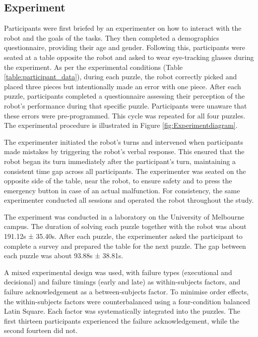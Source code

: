 \subsection{Experiment}



 Participants were first briefed by an experimenter on how to interact with the robot and the goals of the tasks. They then completed a demographics questionnaire, providing their age and gender. Following this, participants were seated at a table opposite the robot and asked to wear eye-tracking glasses during the experiment. As per the experimental conditions (Table \ref{table:participant_data}), during each puzzle, the robot correctly picked and placed three pieces but intentionally made an error with one piece. After each puzzle, participants completed a questionnaire assessing their perception of the robot's performance during that specific puzzle. Participants were unaware that these errors were pre-programmed. This cycle was repeated for all four puzzles. The experimental procedure is illustrated in Figure \ref{fig:Experimentdiagram}.

The experimenter initiated the robot's turns and intervened when participants made mistakes by triggering the robot's verbal response. This ensured that the robot began its turn immediately after the participant's turn, maintaining a consistent time gap across all participants. The experimenter was seated on the opposite side of the table, near the robot, to ensure safety and to press the emergency button in case of an actual malfunction. For consistency, the same experimenter conducted all sessions and operated the robot throughout the study.




The experiment was conducted in a laboratory on the University of Melbourne campus. The duration of solving each puzzle together with the robot was about 191.12s ± 35.40s. After each puzzle, the experimenter asked the participant to complete a survey and prepared the table for the next puzzle. The gap between each puzzle was about 93.88s ± 38.81s.


A mixed experimental design was used, with failure types (executional and decisional) and failure timings (early and late) as within-subjects factors, and failure acknowledgement as a between-subjects factor. To minimise order effects, the within-subjects factors were counterbalanced using a four-condition balanced Latin Square. Each factor was systematically integrated into the puzzles. The first thirteen participants experienced the failure acknowledgement, while the second fourteen did not. 



